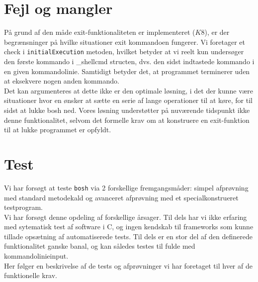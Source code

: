 \documentclass[final]{article}
\begin{document}
\section{Fejl og mangler}
\label{sec:fm}
På grund af den måde exit-funktionaliteten er implementeret ($K8$), er der begrænsninger på hvilke situationer exit kommandoen fungerer. Vi foretager et check i \texttt{initialExecution} metoden, hvilket betyder at vi reelt kun undersøger den første kommando i \_shellcmd structen, dvs. den sidst indtastede kommando i en given kommandolinie. Samtidigt betyder det, at programmet terminerer uden at eksekvere nogen anden kommando.\\

Det kan argumenteres at dette ikke er den optimale løsning, i det der kunne være situationer hvor en ønsker at sætte en serie af lange operationer til at køre, for til sidst at lukke bosh ned. Vores løsning understøtter på nuværende tidspunkt ikke denne funktionalitet, selvom det formelle krav om at konstruere en exit-funktion til at lukke programmet er opfyldt.

\section{Test}
Vi har forsøgt at teste \texttt{bosh} via 2 forskellige fremgangsmåder: simpel afprøvning med standard metodekald og avanceret afprøvning med et specialkonstrueret testprogram.\\

Vi har forsøgt denne opdeling af forskellige årsager. Til dels har vi ikke erfaring med sytematisk test af software i C, og ingen kendskab til frameworks som kunne tillade opsætning af automatiserede tests. Til dels er en stor del af den definerede funktionalitet ganske banal, og kan således testes til fulde med kommandolinieinput.\\

Her følger en beskrivelse af de tests og afprøvninger vi har foretaget til hver af de funktionelle krav.
\end{document}
